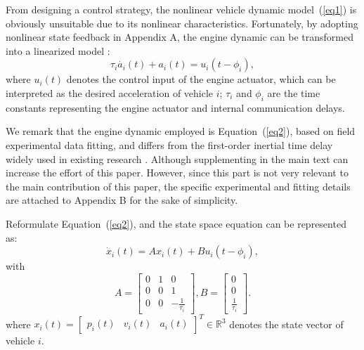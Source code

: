 \documentclass[journal]{IEEEtran}
\begin{document}
From designing a control strategy, the nonlinear vehicle dynamic model~(\ref{eq1}) is obviously unsuitable due to its nonlinear characteristics. Fortunately, by adopting nonlinear state feedback in Appendix A, the engine dynamic can be transformed into a linearized model \citep{Wang2018e}:
\begin{equation}
  \tau_i\dot{a_i}\left(t\right)+a_i\left(t\right)=u_i(t-\phi_i),
  \label{eq2}
\end{equation}
where $u_i(t)$ denotes the control input of the engine actuator, which can be interpreted as the desired acceleration of vehicle $i$; $\tau_i$ and $\phi_i$ are the time constants representing the engine actuator and internal communication delays.

We remark that the engine dynamic employed is Equation~(\ref{eq2}), based on field experimental data fitting, and differs from the first-order inertial time delay widely used in existing research \citep{Wang2018e,Coskun2021,Zhang2021,Ma2021}. Although supplementing in the main text can increase the effort of this paper. However, since this part is not very relevant to the main contribution of this paper, the specific experimental and fitting details are attached to Appendix B for the sake of simplicity.

Reformulate Equation~(\ref{eq2}), and the state space equation can be represented as:
\begin{equation}
  {\dot x_i}\left( t \right) = A{x_i}\left( t \right) + B{u_i}\left( {t - {\phi _i}} \right),
  \label{eq3}
\end{equation}
with
\begin{equation}
  A = \left[ {\begin{array}{*{20}{c}}
          0 & 1 & 0                          \\
          0 & 0 & 1                          \\
          0 & 0 & { - \frac{1}{{{\tau _i}}}}
        \end{array}} \right],B = \left[ {\begin{array}{*{20}{c}}
          0 \\
          0 \\
          {\frac{1}{{{\tau _i}}}}
        \end{array}} \right].
  \label{eq4}
\end{equation}
where ${x_i}\left( t \right) = {\left[ {\begin{array}{*{20}{c}}
          {{p_i}\left( t \right)} & {{v_i}\left( t \right)} & {{a_i}\left( t \right)}
        \end{array}} \right]^T} \in {\mathbb{R}^3}$ denotes the state vector of vehicle $i$.
\end{document}
